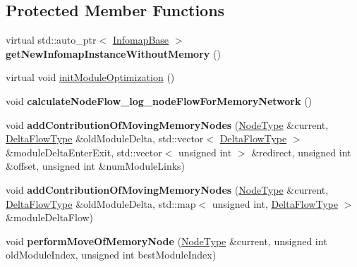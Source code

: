 \subsection*{Protected Member Functions}
\begin{DoxyCompactItemize}
\item 
\mbox{\label{classInfomapGreedyTypeSpecialized_af8f8746ab7c713530b60e55d39da03d9}} 
virtual std\+::auto\+\_\+ptr$<$ \mbox{\hyperlink{classInfomapBase}{Infomap\+Base}} $>$ {\bfseries get\+New\+Infomap\+Instance\+Without\+Memory} ()
\item 
virtual void \mbox{\hyperlink{classInfomapGreedyTypeSpecialized_a2f5fa9b865bcded24d7875f56d28d4c5}{init\+Module\+Optimization}} ()
\item 
\mbox{\label{classInfomapGreedyTypeSpecialized_a7bcc7c45d3c7b5527e4dca2e4b19cf05}} 
void {\bfseries calculate\+Node\+Flow\+\_\+log\+\_\+node\+Flow\+For\+Memory\+Network} ()
\item 
\mbox{\label{classInfomapGreedyTypeSpecialized_aa15a9fb88e7ec7eae671b7ae13ab0901}} 
void {\bfseries add\+Contribution\+Of\+Moving\+Memory\+Nodes} (\mbox{\hyperlink{classNode}{Node\+Type}} \&current, \mbox{\hyperlink{structDeltaFlow}{Delta\+Flow\+Type}} \&old\+Module\+Delta, std\+::vector$<$ \mbox{\hyperlink{structDeltaFlow}{Delta\+Flow\+Type}} $>$ \&module\+Delta\+Enter\+Exit, std\+::vector$<$ unsigned int $>$ \&redirect, unsigned int \&offset, unsigned int \&num\+Module\+Links)
\item 
\mbox{\label{classInfomapGreedyTypeSpecialized_a61ccd386e0ab5552aab67ee63a34ea7a}} 
void {\bfseries add\+Contribution\+Of\+Moving\+Memory\+Nodes} (\mbox{\hyperlink{classNode}{Node\+Type}} \&current, \mbox{\hyperlink{structDeltaFlow}{Delta\+Flow\+Type}} \&old\+Module\+Delta, std\+::map$<$ unsigned int, \mbox{\hyperlink{structDeltaFlow}{Delta\+Flow\+Type}} $>$ \&module\+Delta\+Flow)
\item 
\mbox{\label{classInfomapGreedyTypeSpecialized_aae456e945275ad0273f64ebfa9e5b684}} 
void {\bfseries perform\+Move\+Of\+Memory\+Node} (\mbox{\hyperlink{classNode}{Node\+Type}} \&current, unsigned int old\+Module\+Index, unsigned int best\+Module\+Index)

\end{DoxyCompactItemize}
